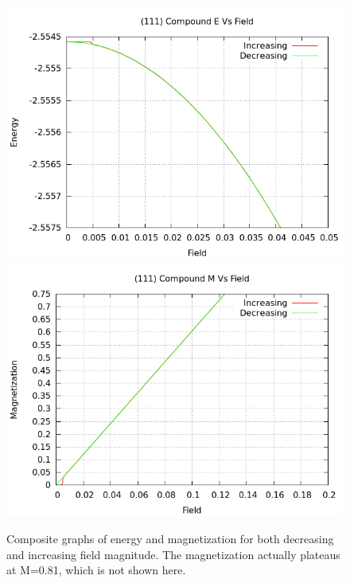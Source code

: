 \documentclass{article}
\begin{document}
\begin{figure}[ht]
\centering
\includegraphics[scale=0.6]{HVariedData/compoundEM/111Ecompound.png}
\includegraphics[scale=0.6]{HVariedData/compoundEM/111Mcompound.png}
\caption{Composite graphs of energy and magnetization for both decreasing and increasing field magnitude. The 
magnetization actually plateaus at M=0.81, which is not shown here.}
\end{figure}
\clearpage
\end{document}
